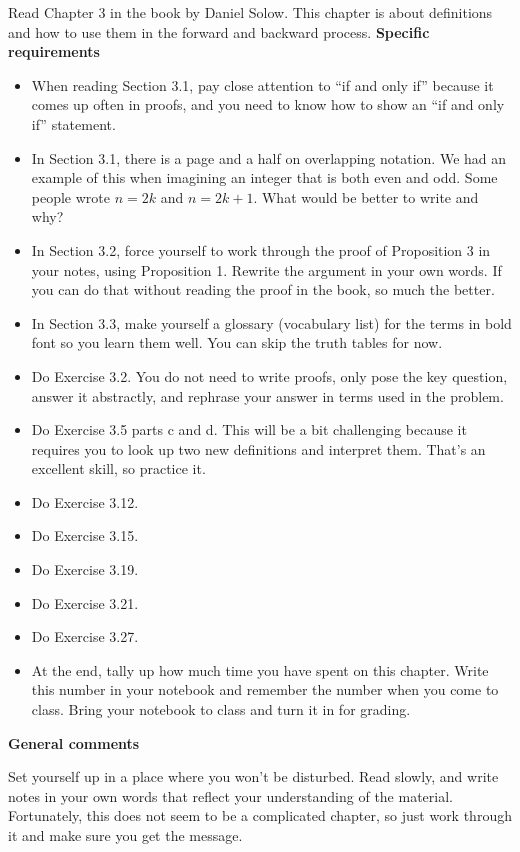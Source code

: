 
Read Chapter 3 in the book by Daniel Solow.
This chapter is about definitions and how to use them in the forward and backward process.
\noindent
{\bf Specific requirements}

\begin{itemize}
\item When reading Section 3.1, pay close attention to ``if and only if'' because it comes up often in proofs, and you need to know how to show an ``if and only if'' statement.

\item In Section 3.1, there is a page and a half on overlapping notation.
We had an example of this when imagining an integer that is both even and odd.
Some people wrote $n=2k$ and $n=2k+1$.
What would be better to write and why?

\item In Section 3.2, force yourself to work through the proof of Proposition 3 in your notes, using Proposition 1.
Rewrite the argument in your own words.
If you can do that without reading the proof in the book, so much the better.

\item In Section 3.3, make yourself a glossary (vocabulary list) for the terms in bold font so you learn them well.
You can skip the truth tables for now.

\item Do Exercise 3.2.  You do not need to write proofs, only pose the key question, answer it abstractly, and rephrase your answer in terms used in the problem.

\item Do Exercise 3.5 parts c and d.
This will be a bit challenging because it requires you to look up two new definitions and interpret them.
That's an excellent skill, so practice it.

\item Do Exercise 3.12.

\item Do Exercise 3.15.

\item Do Exercise 3.19.

\item Do Exercise 3.21.

\item Do Exercise 3.27.


\item At the end, tally up how much time you have spent on this chapter.
Write this number in your notebook and remember the number when you come to class.
Bring your notebook to class and turn it in for grading.
\end{itemize}

\noindent
{\bf General comments}

Set yourself up in a place where you won't be disturbed.
Read slowly, and write notes in your own words that reflect your understanding of the material.
Fortunately, this does not seem to be a complicated chapter, so just work through it and make sure you get the message.

